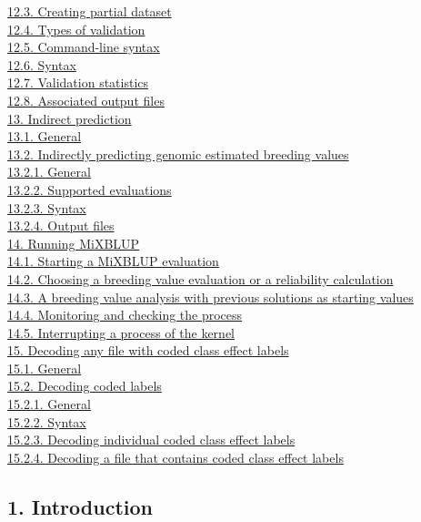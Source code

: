 \hyperref[Vali05]{12.3. Creating partial dataset}\\
\hyperref[Vali06]{12.4. Types of validation}\\
\hyperref[Vali07]{12.5. Command-line syntax}\\
\hyperref[Vali08]{12.6. Syntax}\\
\hyperref[Vali09]{12.7. Validation statistics}\\
\hyperref[Vali10]{12.8. Associated output files}\\
\hyperref[Indi01]{13. Indirect prediction}\\
\hyperref[Indi02]{13.1. General}\\
\hyperref[Indi03]{13.2. Indirectly predicting genomic estimated breeding
values}\\
\hyperref[Indi04]{13.2.1. General}\\
\hyperref[Indi05]{13.2.2. Supported evaluations}\\
\hyperref[Indi06]{13.2.3. Syntax}\\
\hyperref[Indi07]{13.2.4. Output files}\\
\hyperref[Runn01]{14. Running MiXBLUP}\\
\hyperref[Runn02]{14.1. Starting a MiXBLUP evaluation}\\
\hyperref[Runn03]{14.2. Choosing a breeding value evaluation or a
reliability calculation}\\
\hyperref[Runn04]{14.3. A breeding value analysis with previous
solutions as starting values}\\
\hyperref[Runn05]{14.4. Monitoring and checking the process}\\
\hyperref[Runn06]{14.5. Interrupting a process of the kernel}\\
\hyperref[Deco01]{15. Decoding any file with coded class effect
labels}\\
\hyperref[Deco02]{15.1. General}\\
\hyperref[Deco03]{15.2. Decoding coded labels}\\
\hyperref[Deco04]{15.2.1. General}\\
\hyperref[Deco05]{15.2.2. Syntax}\\
\hyperref[Deco06]{15.2.3. Decoding individual coded class effect
labels}\\
\hyperref[Deco07]{15.2.4. Decoding a file that contains coded class
effect labels}\\

\newpage

\subsection{1. Introduction}\label{Intr01}

